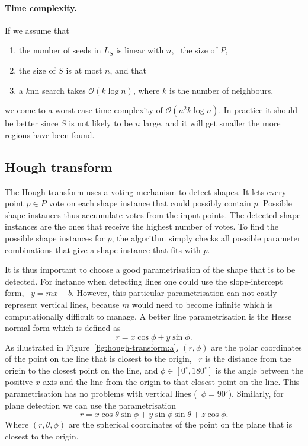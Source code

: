 \paragraph{Time complexity.} If we assume that
\begin{enumerate}
	\item the number of seeds in $L_{S}$ is linear with $n$, \ie\ the size of $P$,
	\item the size of $S$ is at most $n$, and that
	\item a $k$nn search takes $\mathcal{O}{(k\log{n})}$, where $k$ is the number of neighbours,
\end{enumerate}
we come to a worst-case time complexity of $\mathcal{O}(n^2k\log{n})$.
In practice it should be better since $S$ is not likely to be $n$ large, and it will get smaller the more regions have been found.


\subsection{Hough transform}%

The Hough transform uses a voting mechanism to detect shapes.
It lets every point $p \in P$ vote on each shape instance that could possibly contain $p$.
Possible shape instances thus accumulate votes from the input points.
The detected shape instances are the ones that receive the highest number of votes.
To find the possible shape instances for $p$, the algorithm simply checks all possible parameter combinations that give a shape instance that fits with $p$.

It is thus important to choose a good parametrisation of the shape that is to be detected.
For instance when detecting lines one could use the slope-intercept form, \ie\ $y = mx+b$.
However, this particular parametrisation can not easily represent vertical lines, because $m$ would need to become infinite which is computationally difficult to manage. 
A better line parametrisation is the Hesse normal form which is defined as 
\[
r = x\cos{\phi} + y\sin{\phi}. 
\]
As illustrated in Figure~\ref{fig:hough-transform:a}, $(r,\phi)$ are the polar coordinates of the point on the line that is closest to the origin, \ie\ $r$ is the distance from the origin to the closest point on the line, and $\phi \in [0^\circ, 180^\circ]$ is the angle between the positive $x$-axis and the line from the origin to that closest point on the line. 
This parametrisation has no problems with vertical lines (\ie\ $\phi=90^{\circ}$).
Similarly, for plane detection we can use the parametrisation
\[
r = x \cos{\theta} \sin{\phi} + y \sin{\phi} \sin{\theta} + z \cos{\phi}.
\]
Where $(r, \theta, \phi)$ are the spherical coordinates of the point on the plane that is closest to the origin.

